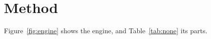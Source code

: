 \section{Method}\label{sec:method}
Figure~\ref{fig:engine} shows the engine, and Table~\ref{tab:none} its parts.
